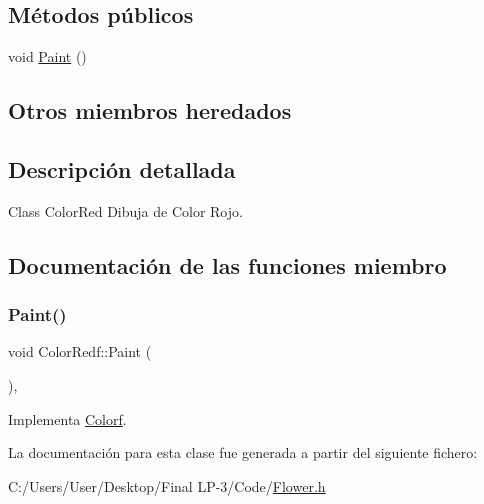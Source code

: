 \subsection*{Métodos públicos}
\begin{DoxyCompactItemize}
\item 
void \mbox{\hyperlink{class_color_redf_ade02bd6ba77abcde9f3cae566141f663}{Paint}} ()
\end{DoxyCompactItemize}
\subsection*{Otros miembros heredados}


\subsection{Descripción detallada}
Class Color\+Red Dibuja de Color Rojo. 

\subsection{Documentación de las funciones miembro}
\mbox{\label{class_color_redf_ade02bd6ba77abcde9f3cae566141f663}} 
\subsubsection{\texorpdfstring{Paint()}{Paint()}}
{\footnotesize\ttfamily void Color\+Redf\+::\+Paint (\begin{DoxyParamCaption}{ }\end{DoxyParamCaption})\hspace{0.3cm}{\ttfamily [inline]}, {\ttfamily [virtual]}}



Implementa \mbox{\hyperlink{class_colorf_a0f98347b94d26eec7f53b33f71c10a66}{Colorf}}.



La documentación para esta clase fue generada a partir del siguiente fichero\+:\begin{DoxyCompactItemize}
\item 
C\+:/\+Users/\+User/\+Desktop/\+Final L\+P-\/3/\+Code/\mbox{\hyperlink{_flower_8h}{Flower.\+h}}\end{DoxyCompactItemize}
